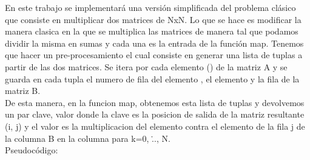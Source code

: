 En este trabajo se implementará una versión simplificada del problema clásico
que consiste en multiplicar dos matrices de NxN.
Lo que se hace es modificar la manera clasica en la que se multiplica las matrices
de manera tal que podamos dividir la misma en sumas y cada una es la entrada de
la función map.
Tenemos que hacer un pre-procesamiento el cual consiste en generar una lista de
tuplas a partir de las dos matrices. Se itera por cada elemento ()
de la matriz A y se guarda en cada tupla el numero de fila del elemento
, el elemento  y la fila  de la matriz B.\\

De esta manera, en la funcion map, obtenemos esta lista de tuplas y devolvemos
un par clave, valor donde la clave es la posicion de salida de la matriz
resultante (i, j) y el valor es la multiplicacion del elemento 
contra el elemento de la fila j de la columna B en la columna 
 para k=0, \..., N. \\
Pseudocódigo:
